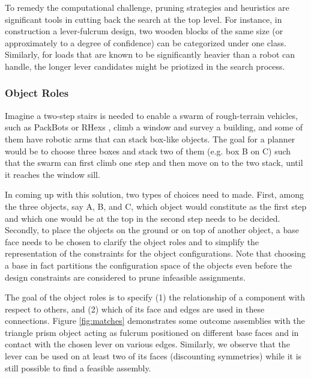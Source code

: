 \documentclass[runningheads,a4paper]{llncs}
\begin{document}
To remedy the computational challenge, pruning strategies and heuristics are significant tools in
cutting back the search at the top level. For instance, in construction a lever-fulcrum design,
two wooden blocks of the same size (or approximately to a degree of confidence) can be categorized
under one class. Similarly, for loads that are known to be significantly heavier than a robot can
handle, the longer lever candidates might be priotized in the search process.

\subsubsection{Object Roles} 

Imagine a two-step stairs is needed to enable a swarm of rough-terrain vehicles, such as 
PackBots or RHexs \cite{yamauchi2004packbot,saranli2001rhex}, climb a window and survey a building, and some of them have robotic
arms that can stack box-like objects. The goal for a planner would be to choose three boxes and
stack two of them (e.g. box B on C) such that the swarm can first climb one step and then move on to
the two stack, until it reaches the window sill. 

In coming up with this solution, two types of choices need to made. First, among the three objects,
say A, B, and C, which object would constitute as the first step and which one would be at the top
in the second step needs to be decided. Secondly, to place the objects on the ground or on top of
another object, a base face needs to be chosen to clarify the object roles and to simplify the
representation of the constraints for the object configurations. Note that choosing a base 
in fact partitions the configuration space of the objects even before the design constraints
are considered to prune infeasible assignments.

The goal of the object roles is to specify (1) the relationship of a component with respect to
others, and (2) which of its face and edges are used in these connections. Figure \ref{fig:matches} 
\cite{erdogan2014incorporating} demonstrates some outcome assemblies with the triangle prism
object acting as fulcrum positioned on different base faces and in contact with the chosen lever
on various edges. Similarly, we observe that the lever can be used on at least two of its faces
(discounting symmetries) while it is still possible to find a feasible assembly. 
\end{document}
